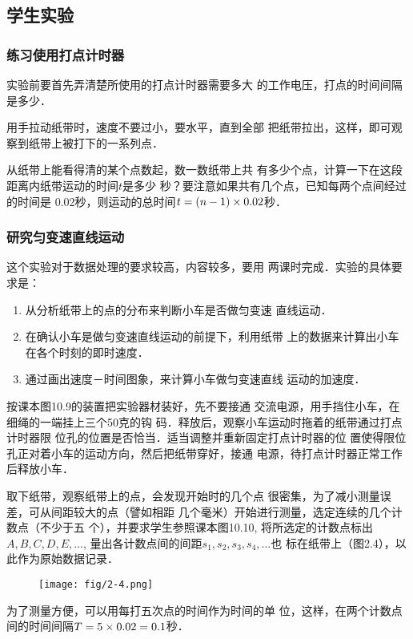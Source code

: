 \subsection{学生实验}
\subsubsection{练习使用打点计时器}
实验前要首先弄清楚所使用的打点计时器需要多大
的工作电压，打点的时间间隔是多少．

用手拉动纸带时，速度不要过小，要水平，直到全部
把纸带拉出，这样，即可观察到纸带上被打下的一系列点．

从纸带上能看得清的某个点数起，数一数纸带上共
有多少个点，计算一下在这段距离内纸带运动的时间$t$是多少
秒？要注意如果共有几个点，已知每两个点间经过的时间是
0.02秒，则运动的总时间$t=(n-1)\times0.02$秒．


\subsubsection{研究匀变速直线运动}
这个实验对于数据处理的要求较高，内容较多，要用
两课时完成．实验的具体要求是：
\begin{enumerate}
\item 从分析纸带上的点的分布来判断小车是否做匀变速
直线运动．
\item 在确认小车是做匀变速直线运动的前提下，利用纸带
上的数据来计算出小车在各个时刻的即时速度．
\item 通过画出速度－时间图象，来计算小车做匀变速直线
运动的加速度．
\end{enumerate}

按课本图10.9的装置把实验器材装好，先不要接通
交流电源，用手挡住小车，在细绳的一端挂上三个50克的钩
码．释放后，观察小车运动时拖着的纸带通过打点计时器限
位孔的位置是否恰当．适当调整并重新固定打点计时器的位
置使得限位孔正对着小车的运动方向，然后把纸带穿好，接通
电源，待打点计时器正常工作后释放小车．

取下纸带，观察纸带上的点，会发现开始时的几个点
很密集，为了减小测量误差，可从间距较大的点（譬如相距
几个毫米）开始进行测量，选定连续的几个计数点（不少于五
个），并要求学生参照课本图10.10, 将所选定的计数点标出
$A,B,C,D,E,\ldots$, 量出各计数点间的间距$s_1,s_2,s_3,s_4,\ldots$也
标在纸带上（图2.4），以此作为原始数据记录．
\begin{figure}[htp]
    \centering
    \texttt{[image: fig/2-4.png]}
    \caption{}
\end{figure}

为了测量方便，可以用每打五次点的时间作为时间的单
位，这样，在两个计数点间的时间间隔$T=5\times0.02=0.1$秒．

